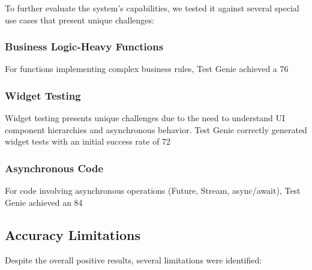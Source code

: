 To further evaluate the system's capabilities, we tested it against several special use cases that present unique challenges:

\subsubsection{Business Logic-Heavy Functions}

For functions implementing complex business rules, Test Genie achieved a 76%

\subsubsection{Widget Testing}

Widget testing presents unique challenges due to the need to understand UI component hierarchies and asynchronous behavior. Test Genie correctly generated widget tests with an initial success rate of 72%

\subsubsection{Asynchronous Code}

For code involving asynchronous operations (Future, Stream, async/await), Test Genie achieved an 84%

\subsection{Accuracy Limitations}

Despite the overall positive results, several limitations were identified:

